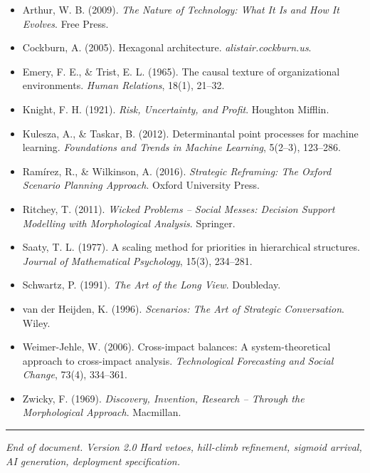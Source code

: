 \documentclass[11pt,a4paper]{article}
\begin{document}
\begin{itemize}[leftmargin=*]
  \item Arthur, W. B. (2009). \textit{The Nature of Technology: What It Is and How It Evolves}. Free Press.
  \item Cockburn, A. (2005). Hexagonal architecture. \textit{alistair.cockburn.us}.
  \item Emery, F. E., \& Trist, E. L. (1965). The causal texture of organizational environments. \textit{Human Relations}, 18(1), 21--32.
  \item Knight, F. H. (1921). \textit{Risk, Uncertainty, and Profit}. Houghton Mifflin.
  \item Kulesza, A., \& Taskar, B. (2012). Determinantal point processes for machine learning. \textit{Foundations and Trends in Machine Learning}, 5(2--3), 123--286.
  \item Ramírez, R., \& Wilkinson, A. (2016). \textit{Strategic Reframing: The Oxford Scenario Planning Approach}. Oxford University Press.
  \item Ritchey, T. (2011). \textit{Wicked Problems -- Social Messes: Decision Support Modelling with Morphological Analysis}. Springer.
  \item Saaty, T. L. (1977). A scaling method for priorities in hierarchical structures. \textit{Journal of Mathematical Psychology}, 15(3), 234--281.
  \item Schwartz, P. (1991). \textit{The Art of the Long View}. Doubleday.
  \item van der Heijden, K. (1996). \textit{Scenarios: The Art of Strategic Conversation}. Wiley.
  \item Weimer-Jehle, W. (2006). Cross-impact balances: A system-theoretical approach to cross-impact analysis. \textit{Technological Forecasting and Social Change}, 73(4), 334--361.
  \item Zwicky, F. (1969). \textit{Discovery, Invention, Research -- Through the Morphological Approach}. Macmillan.
\end{itemize}

\vfill
\hrule
\vspace{0.5em}
\noindent\textit{\small\color{slate500} End of document. Version 2.0 \textbullet{} Hard vetoes, hill-climb refinement, sigmoid arrival, AI generation, deployment specification.}
\end{document}
